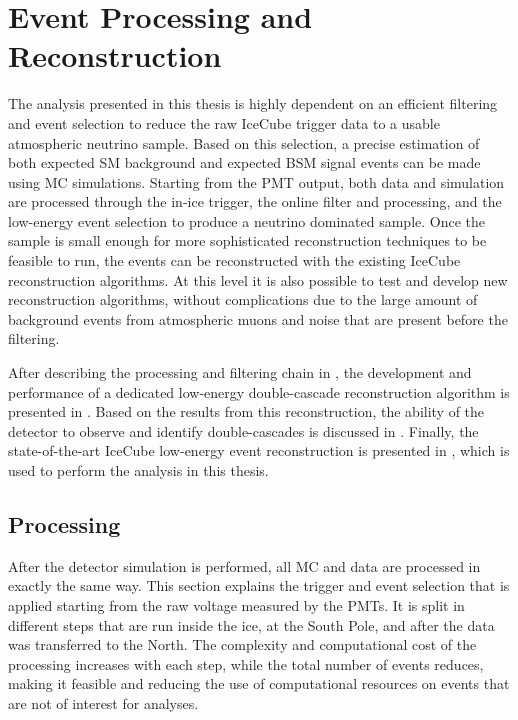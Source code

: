 \setchapterpreamble[u]{\margintoc}


\chapter{Event Processing and Reconstruction}

The analysis presented in this thesis is highly dependent on an efficient filtering and event selection to reduce the raw IceCube trigger data to a usable atmospheric neutrino sample. Based on this selection, a precise estimation of both expected SM background and expected BSM signal events can be made using MC simulations. Starting from the PMT output, both data and simulation are processed through the in-ice trigger, the online filter and processing, and the low-energy event selection to produce a neutrino dominated sample. Once the sample is small enough for more sophisticated reconstruction techniques to be feasible to run, the events can be reconstructed with the existing IceCube reconstruction algorithms. At this level it is also possible to test and develop new reconstruction algorithms, without complications due to the large amount of background events from atmospheric muons and noise that are present before the filtering.

After describing the processing and filtering chain in , the development and performance of a dedicated low-energy double-cascade reconstruction algorithm is presented in . Based on the results from this reconstruction, the ability of the detector to observe and identify double-cascades is discussed in . Finally, the state-of-the-art IceCube low-energy event reconstruction is presented in , which is used to perform the analysis in this thesis.


\section{Processing} 

After the detector simulation is performed, all MC and data are processed in exactly the same way. This section explains the trigger and event selection that is applied starting from the raw voltage measured by the PMTs. It is split in different steps that are run inside the ice, at the South Pole, and after the data was transferred to the North. The complexity and computational cost of the processing increases with each step, while the total number of events reduces, making it feasible and reducing the use of computational resources on events that are not of interest for analyses. 


